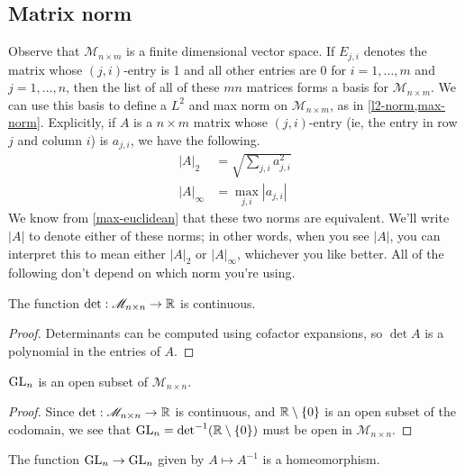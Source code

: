 \subsection{Matrix norm} \label{matrix-norm}

Observe that $\mathscr{M}_{n \times m}$ is a finite dimensional vector space. If $E_{j,i}$ denotes the matrix whose $(j,i)$-entry is 1 and all other entries are 0 for $i = 1, \dotsc, m$ and $j = 1, \dotsc, n$, then the list of all of these $mn$ matrices forms a basis for $\mathscr{M}_{n \times m}$. We can use this basis to define a $L^2$ and max norm on $\mathscr{M}_{n \times m}$, as in \cref{l2-norm,max-norm}.  Explicitly, if $A$ is a $n \times m$ matrix whose $(j,i)$-entry (ie, the entry in row $j$ and column $i$) is $a_{j,i}$, we have the following. 
\[ \begin{aligned} |A|_2 &= \sqrt{ \sum_{j,i} a_{j,i}^2 } \\
|A|_\infty &= \max_{j,i} |a_{j,i}| \end{aligned}  \]
We know from \cref{max-euclidean} that these two norms are equivalent. We'll write $|A|$ to denote either of these norms; in other words, when you see $|A|$, you can interpret this to mean either $|A|_2$ or $|A|_\infty$, whichever you like better. All of the following don't depend on which norm you're using. 

\begin{lemma}
	The function $\det : \mathscr{M}_{n \times n} \to \mathbb{R}$ is continuous.
\end{lemma}

\begin{proof}
	Determinants can be computed using cofactor expansions, so $\det A$ is a polynomial in the entries of $A$.
\end{proof}

\begin{corollary} \label{gln-open} 
	$\operatorname{GL}_n$ is an open subset of $\mathscr{M}_{n \times n}$.
\end{corollary}

\begin{proof}
	Since $\det : \mathscr{M}_{n \times n} \to \mathbb{R}$ is continuous, and $\mathbb{R} \setminus \{0\}$ is an open subset of the codomain, we see that $\operatorname{GL}_n = \text{det}^{-1}(\mathbb{R} \setminus \{0\})$ must be open in $\mathscr{M}_{n \times n}$. 
\end{proof}

\begin{lemma} \label{matrix-inversion-homeomorphism}  
	The function $\operatorname{GL}_n \to \operatorname{GL}_n$ given by $A \mapsto A^{-1}$ is a homeomorphism. 
\end{lemma}

